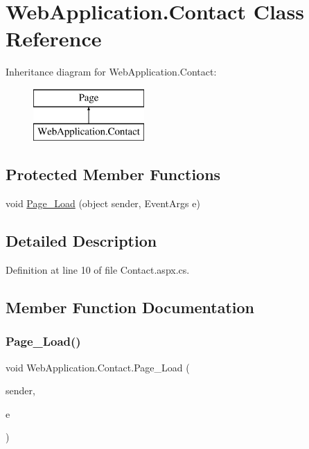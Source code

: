 \hypertarget{classWebApplication_1_1Contact}{}\section{Web\+Application.\+Contact Class Reference}
\label{classWebApplication_1_1Contact}
Inheritance diagram for Web\+Application.\+Contact\+:\begin{figure}[H]
\begin{center}
\leavevmode
\includegraphics[height=2.000000cm]{dc/dc0/classWebApplication_1_1Contact}
\end{center}
\end{figure}
\subsection*{Protected Member Functions}
\begin{DoxyCompactItemize}
\item 
void \mbox{\hyperlink{classWebApplication_1_1Contact_ab1f67b66acd64d7edf13c0096c067eac}{Page\+\_\+\+Load}} (object sender, Event\+Args e)
\end{DoxyCompactItemize}


\subsection{Detailed Description}


Definition at line 10 of file Contact.\+aspx.\+cs.



\subsection{Member Function Documentation}
\mbox{\label{classWebApplication_1_1Contact_ab1f67b66acd64d7edf13c0096c067eac}} 
\subsubsection{\texorpdfstring{Page\_Load()}{Page\_Load()}}
{\footnotesize\ttfamily void Web\+Application.\+Contact.\+Page\+\_\+\+Load (\begin{DoxyParamCaption}\item[{object}]{sender,  }\item[{Event\+Args}]{e }\end{DoxyParamCaption})\hspace{0.3cm}{\ttfamily [protected]}}



